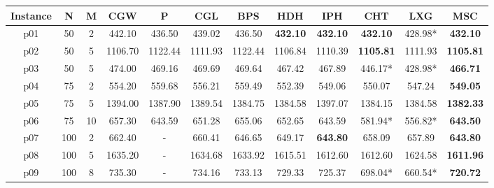 \begin{table}[h!]
  \centering
  \small\addtolength{\tabcolsep}{-5pt}
  \begin{tabular}{|c|c|c|c|c|c|c|c|c|c|c|c|}
    \hline
    Instance & N   & M  & CGW             & P                & CGL              & BPS              & HDH              & IPH              & CHT              & LXG              & MSC              \\\hline
    p01      & 50  & 2  & 442.10          & 436.50           & 439.02           & 436.50           & \textbf{432.10}  & \textbf{432.10}  & \textbf{432.10}  & 428.98*          & \textbf{432.10}  \\\hline
    p02      & 50  & 5  & 1106.70         & 1122.44          & 1111.93          & 1122.44          & 1106.84          & 1110.39          & \textbf{1105.81} & 1111.93          & \textbf{1105.81} \\\hline
    p03      & 50  & 5  & 474.00          & 469.16           & 469.69           & 469.64           & 467.42           & 467.89           & 446.17*          & 428.98*          & \textbf{466.71}  \\\hline
    p04      & 75  & 2  & 554.20          & 559.68           & 556.21           & 559.49           & 552.39           & 549.06           & 550.07           & 547.24           & \textbf{549.05}  \\\hline
    p05      & 75  & 5  & 1394.00         & 1387.90          & 1389.54          & 1384.75          & 1384.58          & 1397.07          & 1384.15          & 1384.58          & \textbf{1382.33} \\\hline
    p06      & 75  & 10 & 657.30          & 643.59           & 651.28           & 655.06           & 652.65           & 643.59           & 581.94*          & 556.82*          & \textbf{643.50}  \\\hline
    p07      & 100 & 2  & 662.40          & -                & 660.41           & 646.65           & 649.17           & \textbf{643.80}  & 658.09           & 657.89           & \textbf{643.80}  \\\hline
    p08      & 100 & 5  & 1635.20         & -                & 1634.68          & 1633.92          & 1615.51          & 1612.60          & 1612.60          & 1624.58          & \textbf{1611.96} \\\hline
    p09      & 100 & 8  & 735.30          & -                & 734.16           & 733.13           & 729.33           & 725.37           & 698.04*          & 660.54*          & \textbf{720.72}  \\\hline

\end{tabular}
\end{table}
